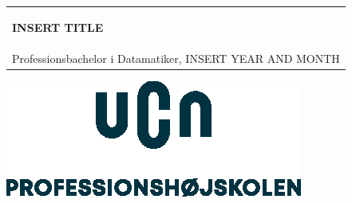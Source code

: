 %
\begin{titlepage}
\pagecolor{ucngrey}\afterpage{\nopagecolor}

\vspace*{\fill}

  \addtolength{\hoffset}{0.5\evensidemargin-0.5\oddsidemargin} %
  \noindent%
  {\color{white}\colorbox{ucnblue}{\begin{tabular}{@{}p{\textwidth}@{}}
    \begin{center}
    \Huge{\textbf{
      INSERT TITLE%
    }}
    \end{center}
    \begin{center}
      \Large{
      }
    \end{center}
    \vspace{0.2cm}
   \begin{center}
    {\Large
      Benyad Jomhur, Lucca Christiansen, Alexandra Østermark, Søren Ravn%
    }\\
    \vspace{0.2cm}
    {\large
    Professionsbachelor i Datamatiker, INSERT YEAR AND MONTH%
    }
   \end{center}
   \vspace{0.2cm}
   \begin{center}
    {\Large
      Prøven i Systemudvikling
    }
   \end{center}
  \end{tabular}}}
  \vfill
  \begin{center}
    \includegraphics[width=0.2\paperwidth]{figures/formalities/UCN-hovedlogo}
  \end{center}
\end{titlepage}
\clearpage
